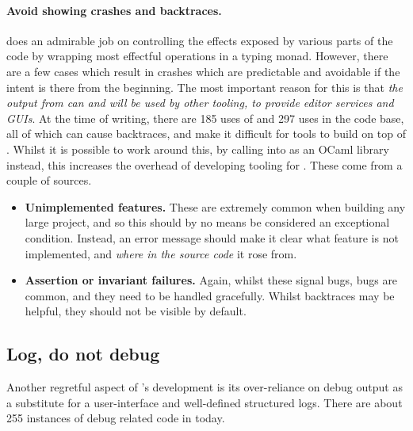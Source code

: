 \paragraph{Avoid showing crashes and backtraces.}  does an admirable job
on controlling the effects exposed by various parts of the code by wrapping
most effectful operations in a typing monad. However, there are a few cases which result in crashes which
are predictable and avoidable if the intent is there from the beginning. The
most important reason for this is that \emph{the output from  can and
will be used by other tooling, to provide editor services and
GUIs}.\label{sn:gui-issues} At the time of writing, there are 185 uses of
 and 297 uses  in the code
base, all of which can cause backtraces, and make it difficult for
tools to build on top of . Whilst it is possible to work
around this, by calling into  as an OCaml library instead,
this increases the overhead of developing tooling for .
These come from a couple of sources.
\begin{itemize}
    \item \textbf{Unimplemented features.} These are extremely common when
        building any large project, and so this should by no means be
        considered an exceptional condition. Instead, an error message should
        make it clear what feature is not implemented, and \emph{where in the
        source code} it rose from.
    \item \textbf{Assertion or invariant failures.} Again, whilst these signal
        bugs, bugs are common, and they need to be handled gracefully. Whilst
        backtraces may be helpful, they should not be visible by default.
\end{itemize}

\subsection{Log, do not debug}

Another regretful aspect of 's development is its over-reliance on debug
output as a substitute for a user-interface and well-defined structured logs.
There are about 255 instances of debug related code in  today.


